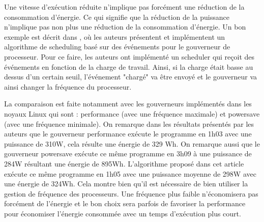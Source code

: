 \begin{onehalfspace}
Une vitesse d'exécution réduite n'implique pas forcément une réduction de la consommation d'énergie. Ce qui signifie que la réduction de la puissance n'implique pas non plus une réduction de la consommation d'énergie. Un bon exemple est décrit dans \cite{ref11}, où les auteurs présentent et implémentent un algorithme de scheduling basé sur des événements pour le gouverneur de processeur. Pour ce faire, les auteurs ont implémenté un scheduler qui reçoit des événements en fonction de la charge de travail. Ainsi, si la charge était basse au dessus d'un certain seuil, l'événement "chargé" va être envoyé et le gouverneur va ainsi changer la fréquence du processeur.\medskip 

La comparaison est faite notamment avec les gouverneurs implémentés dans les noyaux  Linux qui sont : performance (avec une fréquence maximale) et powersave (avec une  fréquence minimale). On remarque dans les résultats présentés par les auteurs que le gouverneur performance exécute le programme en 1h03 avec une puissance de 310W, cela  résulte une énergie de 329 Wh. On remarque aussi que le gouverneur powersave exécute ce même programme en 3h09 à une puissance de 284W résultant une énergie de 895Wh.  L’algorithme proposé dans cet article  exécute ce même programme en 1h05 avec une puissance moyenne de 298W avec  une énergie de 324Wh. Cela montre bien qu’il est nécessaire de bien utiliser  la gestion de fréquence des processeurs. Une fréquence plus faible n’économisera pas forcément de l’énergie et le bon choix sera parfois de favoriser la performance pour économiser l’énergie consommée avec un temps d’exécution plus court.\medskip 



\end{onehalfspace}
